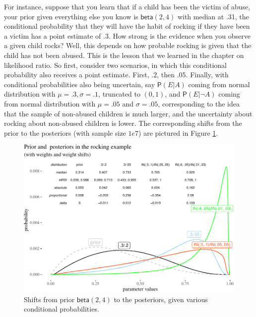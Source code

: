 \documentclass[
  10pt,
  dvipsnames,enabledeprecatedfontcommands]{scrartcl}
\newcommand{\n}{\neg}
\newcommand{\pr}[1]{\mathsf{P}(#1)}
\begin{document}
For instance, suppose that you learn that if a child has been the victim
of abuse, your prior given everything else you know is
\(\mathsf{beta}(2,4)\) with median at .31, the conditional probability
that they will have the habit of rocking if they have been a victim has
a point estimate of .3. How strong is the evidence when you observe a
given child rocks? Well, this depends on how probable rocking is given
that the child has not been abused. This is the lesson that we learned
in the chapter on likelihood ratio. So first, consider two scenarios, in
which this conditional probability also receives a point estimate.
First, \(.2\), then \(.05\). Finally, with conditional probabilities
also being uncertain, say \(\pr{E \vert A}\) coming from normal
distribution with \(\mu = .3, \sigma = .1\), truncated to \((0,1)\), and
\(\pr{E\vert \n A}\) coming from normal distribution with \(\mu = .05\)
and \(\sigma = .05\), corresponding to the idea that the sample of
non-abused children is much larger, and the uncertainty about rocking
about non-abused children is lower. The corresponding shifts from the
prior to the posteriors (with sample size \(1e7\)) are pictured in
Figure \ref{fig:abuse1}.

\begin{figure}[H]

\begin{center}\includegraphics[width=1\linewidth]{imprecision_weight_files/figure-latex/fig:abuse4c-1} \end{center}
\caption{Shifts from prior $\mathsf{beta}(2,4)$ to the posteriors, given various conditional probabilities.}
\label{fig:abuse1}
\end{figure}
\end{document}
